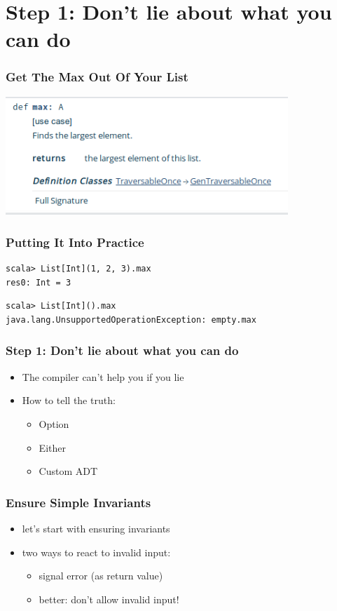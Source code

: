 \documentclass{beamer}
\begin{document}
\section{Step 1: Don't lie about what you can do}

\begin{frame}[fragile]
  \frametitle{Get The Max Out Of Your List}
  \includegraphics[width=0.8\textwidth]{../pics/list-max.png}
\end{frame}

\begin{frame}
  \frametitle{Putting It Into Practice}
  \begin{verbatim}
scala> List[Int](1, 2, 3).max
res0: Int = 3
\end{verbatim}
\begin{verbatim}
scala> List[Int]().max                                                             
java.lang.UnsupportedOperationException: empty.max                                 
\end{verbatim}
\end{frame}

\begin{frame}
  \frametitle{Step 1: Don't lie about what you can do}
  \begin{itemize}
  \item The compiler can't help you if you lie
  \item How to tell the truth:
    \begin{itemize}
    \item Option
    \item Either
    \item Custom ADT
    \end{itemize}
  \end{itemize}
\end{frame}

\begin{frame}
  \frametitle{Ensure Simple Invariants}
  \begin{itemize}
  \item let's start with ensuring invariants
  \item two ways to react to invalid input:
    \begin{itemize}
    \item signal error (as return value)
    \item better: don't allow invalid input!
    \end{itemize}
  \end{itemize}
\end{frame}
\end{document}
